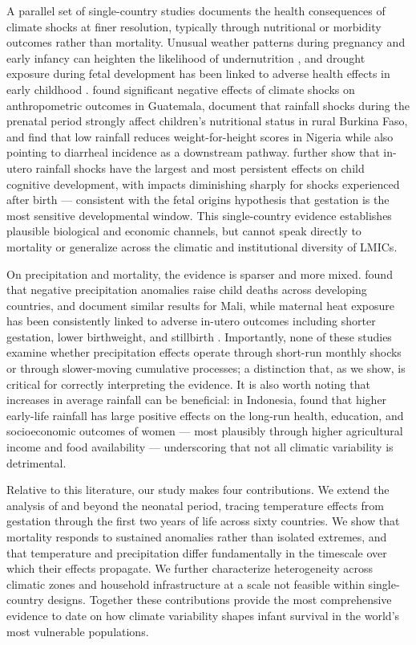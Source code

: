 \documentclass[a4paper]{article}
\begin{document}
A parallel set of single-country studies documents the health consequences of climate shocks at finer resolution, typically through nutritional or morbidity outcomes rather than mortality. Unusual weather patterns during pregnancy and early infancy can heighten the likelihood of undernutrition \parencite{dimitrova2020}, and drought exposure during fetal development has been linked to adverse health effects in early childhood \parencite{nguyen2022}. \textcite{portner2010} found significant negative 
effects of climate shocks on anthropometric outcomes in Guatemala, \textcite{borjean2012} document that rainfall shocks during the prenatal period strongly affect children's nutritional status in rural Burkina Faso, and \textcite{rabassa2014} find that low rainfall reduces weight-for-height scores in Nigeria while also pointing to diarrheal incidence as a downstream pathway. \textcite{akresh2012} further show that in-utero rainfall shocks have the largest and most persistent effects on child cognitive development, with impacts diminishing sharply for shocks experienced after birth — consistent with the fetal origins hypothesis that gestation is the most 
sensitive developmental window. This single-country evidence establishes plausible biological and economic channels, but cannot speak directly to mortality or generalize across the climatic and institutional diversity of LMICs.

On precipitation and mortality, the evidence is sparser and more mixed. \textcite{ponnusamy2022} found that negative precipitation anomalies raise child deaths across developing countries, and \textcite{han2013} document similar results for Mali, while maternal heat exposure has been consistently linked to adverse in-utero outcomes including shorter gestation, lower birthweight, and stillbirth \parencite{kuehn2017,strand2012,sun2020}. Importantly, none of these studies examine whether precipitation effects operate through short-run monthly shocks or through slower-moving cumulative processes; a distinction that, as we show, is critical for correctly interpreting 
the evidence. It is also worth noting that increases in average rainfall can be beneficial: in Indonesia, \textcite{maccini2008} found that higher early-life rainfall has large positive effects on the long-run health, education, and socioeconomic outcomes of women — most plausibly through higher agricultural income and food availability — underscoring that not all climatic variability is detrimental.

Relative to this literature, our study makes four contributions. We extend the analysis of \textcite{dimitrova2024} and \textcite{wang2025} beyond the neonatal period, tracing temperature effects from gestation through the first two years of life across sixty countries. We show that mortality responds to sustained anomalies rather than isolated extremes, and that temperature and precipitation differ fundamentally in the timescale over which their effects propagate. We further characterize 
heterogeneity across climatic zones and household infrastructure at a scale not feasible within single-country designs. Together these contributions provide the most comprehensive evidence to date on how climate variability shapes infant survival in the world's most vulnerable populations.
\end{document}
